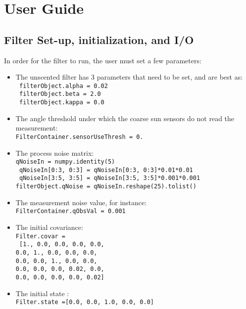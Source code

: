 
\section{User Guide}
\subsection{Filter Set-up, initialization, and I/O}

In order for the filter to run, the user must set a few parameters:

\begin{itemize}
\item The unscented filter has 3 parameters that need to be set, and are best as: \\
      \texttt{ filterObject.alpha = 0.02} \\
      \texttt{ filterObject.beta = 2.0} \\
      \texttt{ filterObject.kappa = 0.0} 
\item The angle threshold under which the coarse sun sensors do not read the measurement: \\ 
\texttt{FilterContainer.sensorUseThresh = 0.}
\item The process noise matrix: \\
   \texttt{qNoiseIn = numpy.identity(5)} \\
   \texttt{ qNoiseIn[0:3, 0:3] = qNoiseIn[0:3, 0:3]*0.01*0.01} \\
   \texttt{ qNoiseIn[3:5, 3:5] = qNoiseIn[3:5, 3:5]*0.001*0.001} \\
    \texttt{filterObject.qNoise = qNoiseIn.reshape(25).tolist()}
\item The measurement noise value, for instance: \\
 \texttt{FilterContainer.qObsVal = 0.001}
\item The initial covariance: \\
 \texttt{Filter.covar =} \\
  \texttt{ [1., 0.0, 0.0, 0.0, 0.0, \\
                          0.0, 1., 0.0, 0.0, 0.0,\\
                          0.0, 0.0, 1., 0.0, 0.0,\\
                          0.0, 0.0, 0.0, 0.02, 0.0,\\
                          0.0, 0.0, 0.0, 0.0, 0.02]}
 \item The initial state :\\
 \texttt{Filter.state =[0.0, 0.0, 1.0, 0.0, 0.0]}
\end{itemize}

